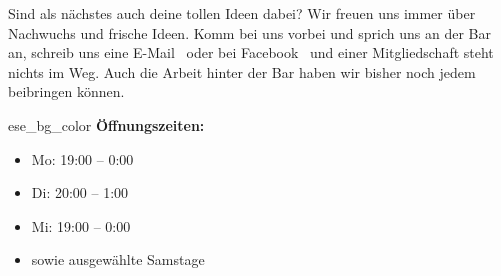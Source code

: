 Sind als nächstes auch deine tollen Ideen dabei?
Wir freuen uns immer über Nachwuchs und frische Ideen.
Komm bei uns vorbei und sprich uns an der Bar an, schreib uns eine E-Mail~ oder bei Facebook~ und einer Mitgliedschaft steht nichts im Weg.
Auch die Arbeit hinter der Bar haben wir bisher noch jedem beibringen können.

\begin{awesomeblock}{2pt}{\faCalendar*[regular]}{ese_bg_color}
    \textbf{Öffnungszeiten:}
    \begin{itemize}[noitemsep]
        \item Mo: 19:00 – 0:00
        \item Di: 20:00 – 1:00
        \item Mi: 19:00 – 0:00
        \item sowie ausgewählte Samstage
        \vspace*{-\baselineskip}
    \end{itemize}
\end{awesomeblock}
